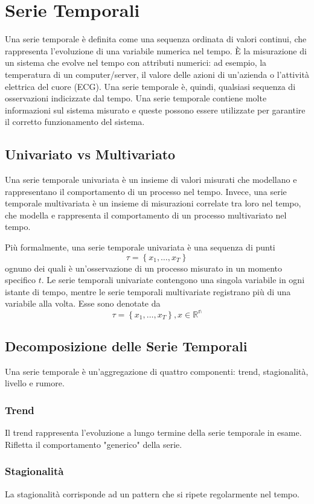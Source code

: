 \section{Serie Temporali}
Una serie temporale è definita come una sequenza ordinata di valori continui, che rappresenta l'evoluzione di una variabile numerica nel tempo. È la misurazione di un sistema che evolve nel tempo con attributi numerici: ad esempio, la temperatura di un computer/server, il valore delle azioni di un'azienda o l'attività elettrica del cuore (ECG). Una serie temporale è, quindi, qualsiasi sequenza di osservazioni indicizzate dal tempo. Una serie temporale contiene molte informazioni sul sistema misurato e queste possono essere utilizzate per garantire il corretto funzionamento del sistema.

\subsection{Univariato vs Multivariato}
Una serie temporale univariata è un insieme di valori misurati che modellano e rappresentano il comportamento di un processo nel tempo. Invece, una serie temporale multivariata è un insieme di misurazioni correlate tra loro nel tempo, che modella e rappresenta il comportamento di un processo multivariato nel tempo. 

Più formalmente, una serie temporale univariata è una sequenza di punti
\[\tau = \left\{ x_1, \ldots, x_T  \right\}\]
ognuno dei quali è un'osservazione di un processo misurato in un momento specifico $t$. Le serie temporali univariate contengono una singola variabile in ogni istante di tempo, mentre le serie temporali multivariate registrano più di una variabile alla volta. Esse sono denotate da
\[\tau = \left\{ x_1, \ldots, x_T  \right\}, x \in \mathbb{R^n} \]

\subsection{Decomposizione delle Serie Temporali}
Una serie temporale è un'aggregazione di quattro componenti: trend, stagionalità, livello e rumore.

\subsubsection{Trend}
Il trend rappresenta l'evoluzione a lungo termine della serie temporale in esame. Rifletta il comportamento "generico" della serie.

\subsubsection{Stagionalità}
La stagionalità corrisponde ad un pattern che si ripete regolarmente nel tempo.


